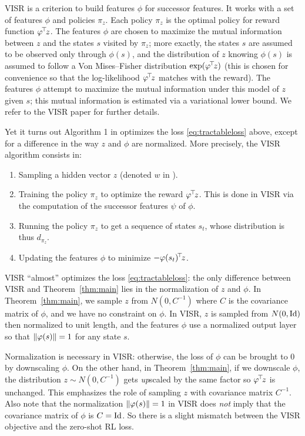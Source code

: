 \documentclass[11pt,a4paper]{article}
\begin{document}
VISR is a criterion to build features $\phi$ for successor features. It
works with a set of features $\phi$ and policies $\pi_z$. Each policy
$\pi_z$ is the optimal policy for reward function $\varphi^{\!\top}\!z$. The
features $\phi$ are chosen to maximize the mutual information between $z$
and the states $s$ visited by $\pi_z$; more exactly, the states $s$ are
assumed to be observed only through $\phi(s)$, and the distribution of
$z$ knowing $\phi(s)$ is assumed to follow a Von Mises--Fisher
distribution $\exp(\varphi^{\!\top}\!z)$ (this is chosen for convenience so
that the log-likelihood $\varphi^{\!\top}\!z$ matches with the reward). The
features $\phi$ attempt to maximize the mutual information under this
model of $z$ given $s$; this mutual information is estimated via a
variational lower bound. We refer to the VISR paper \cite{visr} for
further details.

Yet it turns out Algorithm 1 in \cite{visr} optimizes the loss
\eqref{eq:tractableloss} above, except for a difference in the way
$z$ and $\phi$ are normalized. More precisely, the VISR algorithm
consists in:
\begin{enumerate}
\item Sampling a hidden vector $z$ (denoted $w$ in \cite{visr}).
\item Training the policy $\pi_z$ to optimize the reward
$\varphi^{\!\top}\!z$. This is done in VISR via the computation of the successor
features $\psi$ of $\phi$.
\item Running the policy $\pi_z$ to get a sequence of states $s_t$, whose
distribution is thus $d_{\pi_z}$.
\item Updating the features $\phi$ to minimize $-\varphi(s_t)^{\!\top}\!z$.
\end{enumerate}

VISR ``almost'' optimizes the loss \eqref{eq:tractableloss}:
the only difference between VISR and Theorem~\ref{thm:main} lies in the
normalization of $z$ and $\phi$. In Theorem~\ref{thm:main}, we sample $z$ from $N(0,C^{-1})$
where $C$ is the covariance matrix of $\phi$, and we have no constraint
on $\phi$. In VISR, $z$ is sampled from $N(0,\operatorname{Id})$ then normalized to
unit length, and the features $\phi$ use a normalized output layer so
that $\left\lVert\varphi(s)\right\rVert=1$ for any state $s$.

Normalization is necessary in VISR: otherwise, the loss of $\phi$ can be
brought to $0$ by downscaling $\phi$. On the other hand, in
Theorem~\ref{thm:main}, if we downscale $\phi$, the distribution $z\sim
N(0,C^{-1})$ gets \emph{up}scaled by the same factor so $\varphi^{\!\top}\!z$
is unchanged. This emphasizes the role of sampling $z$ with covariance
matrix
$C^{-1}$. Also note that the normalization $\left\lVert\varphi(s)\right\rVert=1$ in VISR
does \emph{not} imply that the covariance matrix of $\phi$ is $C=\operatorname{Id}$. So there is
a slight mismatch between the VISR objective and the zero-shot RL loss. 
\end{document}
